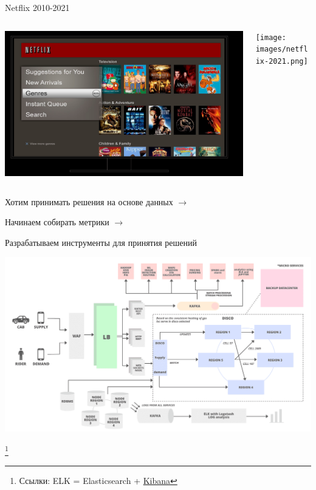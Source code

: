\documentclass[11pt,aspectratio=169,handout]{beamer}
\begin{document}
\begin{frame}{Netflix 2010-2021 \cite{NETFLIXAB}}

\begin{columns}
\begin{column}{0.45\textwidth}
   \begin{center}
		\includegraphics[scale=0.15]{images/netflix-2010.png}
   \end{center}
\end{column}
\begin{column}{0.45\textwidth}
   \begin{center}
		\texttt{[image: images/netflix-2021.png]}
   \end{center}
\end{column}
\end{columns}

\end{frame}

\begin{frame}{}

Хотим принимать решения на основе данных $\rightarrow$ 

\qquad Начинаем собирать метрики $\rightarrow$ 

\qquad \qquad Разрабатываем инструменты для принятия решений

\begin{center}
\includegraphics[scale=0.18]{images/uber.png}
\end{center}

\footnote{Ссылки: ELK = Elasticsearch + \href{https://www.elastic.co/kibana/}{Kibana}}

\end{frame}
\end{document}

